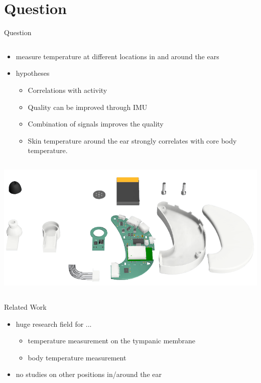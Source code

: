 \documentclass[en]{sdqbeamer}
\begin{document}
\section{Question}
\begin{frame}[fragile]{Question}
    \begin{column}{0.50\textwidth}
        \begin{itemize}
            \item measure temperature at different locations in and around the ears
            \item hypotheses
            \begin{itemize}
                \item Correlations with activity
                \item Quality can be improved through IMU
                \item Combination of signals improves the quality
                \item Skin temperature around the ear strongly correlates with core body temperature.
            \end{itemize}
        \end{itemize}
    \end{column}
    \begin{column}{0.45\textwidth}
        \includegraphics[scale=0.26]{proposal-presentation/images/open_earable_new.png}
    \end{column}
\end{frame}

\begin{frame}[fragile]{Related Work}
    \begin{itemize}
        \item huge research field for ...
        \begin{itemize}
            \item temperature measurement on the tympanic membrane
            \item body temperature measurement
        \end{itemize}
        \item no studies on other positions in/around the ear
    \end{itemize}
\end{frame}
\end{document}
